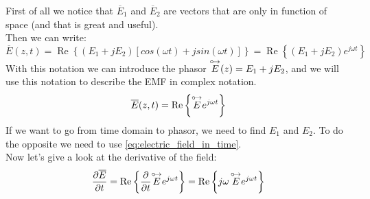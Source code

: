 First of all we notice that $\overline{E}_1$ and $\overline{E}_2$ are vectors that are only in function of space (and that is great and useful).\\
Then we can write:
\begin{equation}
    \overline{E}(z,t)=\operatorname{Re}\left\{(E_1+jE_2)[cos(\omega t)+j sin(\omega t)]\right\}=\operatorname{Re}\left\{(E_1+jE_2)e^{j\omega t}\right\}
\end{equation}
With this notation we can introduce the phasor $\overset{\mathbin {{\circ \mkern-2.5mu\rightarrow}}}{E}(z)=E_1+jE_2$, and we will use this notation to describe the EMF in complex notation.
\begin{equation}\label{eq:electric_field_in_time}
    \overline{E}(z,t)=\operatorname{Re}\left\{\overset{\mathbin {{\circ \mkern-2.5mu\rightarrow}}}{E}e^{j\omega t}\right\}
\end{equation}
If we want to go from time domain to phasor, we need to find $E_1$ and $E_2$. To do the opposite we need to use \cref{eq:electric_field_in_time}.\\
Now let's give a look at the derivative of the field:
\begin{equation}
    \frac{\partial\overline{E}}{\partial t}=\operatorname{Re}\left\{\frac{\partial}{\partial t}\overset{\mathbin {{\circ \mkern-2.5mu\rightarrow}}}{E}e^{j\omega t}\right\}=\operatorname{Re}\left\{j\omega\,\overset{\mathbin {{\circ \mkern-2.5mu\rightarrow}}}{E}e^{j\omega t}\right\}
\end{equation}
